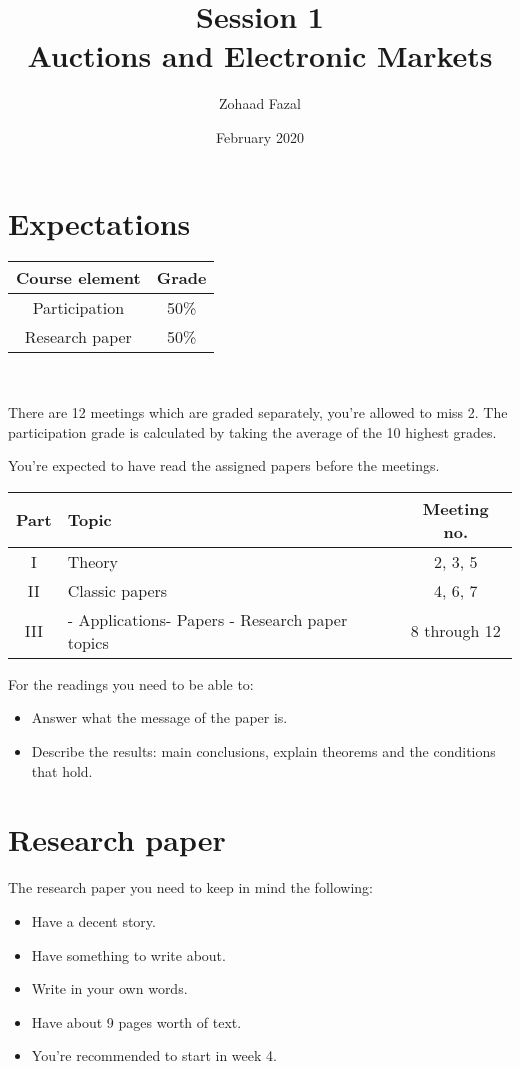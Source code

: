 \documentclass{article}
\title{Session 1 \\
\Large{Auctions and Electronic Markets}
}
\author{Zohaad Fazal}
\date{February 2020}
\begin{document}
\maketitle

\section{Expectations}

\begin{center}
    
\begin{tabular}{c|c}
Course element     & Grade  \\ \hline
Participation     & 50\% \\
Research paper     & 50\%
\end{tabular}\\
\end{center}

\noindent
There are 12 meetings which are graded separately, you're allowed to miss 2. The participation grade is calculated by taking the average of the 10 highest grades.

\noindent
You're expected to have read the assigned papers before the meetings.
\begin{center}
\begin{tabular}{c|p{35mm}|c}
    Part & Topic & Meeting no. \\ \hline
     I&Theory&2, 3, 5\\
     II&Classic papers&4, 6, 7\\
     III&- Applications\newline- Papers \newline- Research paper topics&8 through 12
\end{tabular}
\end{center}

\noindent
For the readings you need to be able to:
\begin{itemize}
    \item Answer what the message of the paper is.
    \item Describe the results: main conclusions, explain theorems and the conditions that hold.
\end{itemize}

\section{Research paper}
The research paper you need to keep in mind the following:

\begin{itemize}
    \item Have a decent story.
    \item Have something to  write about.
    \item Write in your own words.
    \item Have about 9 pages worth of text.
    \item You're recommended to start in week 4.
\end{itemize}
\end{document}
